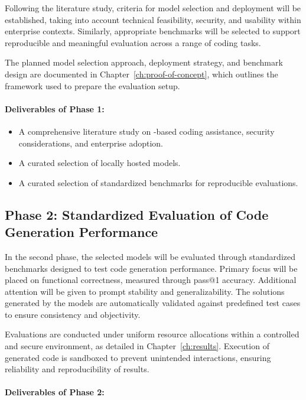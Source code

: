 Following the literature study, criteria for model selection and deployment will be established, taking into account technical feasibility, security, and usability within enterprise contexts. Similarly, appropriate benchmarks will be selected to support reproducible and meaningful evaluation across a range of coding tasks.

The planned model selection approach, deployment strategy, and benchmark design are documented in Chapter~\ref{ch:proof-of-concept}, which outlines the framework used to prepare the evaluation setup.

\paragraph{Deliverables of Phase 1:}
\begin{itemize}
	\item A comprehensive literature study on -based coding assistance, security considerations, and enterprise adoption.
	\item A curated selection of locally hosted models.
	\item A curated selection of standardized benchmarks for reproducible evaluations.
\end{itemize}

\subsection{Phase 2: Standardized Evaluation of Code Generation Performance}

In the second phase, the selected models will be evaluated through standardized benchmarks designed to test code generation performance. Primary focus will be placed on functional correctness, measured through pass@1 accuracy. Additional attention will be given to prompt stability and generalizability. The solutions generated by the models are automatically validated against predefined test cases to ensure consistency and objectivity.

Evaluations are conducted under uniform resource allocations within a controlled and secure environment, as detailed in Chapter~\ref{ch:results}. Execution of generated code is sandboxed to prevent unintended interactions, ensuring reliability and reproducibility of results.

\paragraph{Deliverables of Phase 2:}

